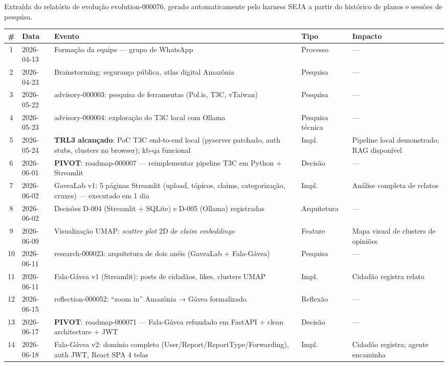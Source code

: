 \documentclass[12pt,a4paper]{article}
\begin{document}
Extraída do relatório de evolução evolution-000076, gerado automaticamente pelo harness
SEJA a partir do histórico de planos e sessões de pesquisa.

\begin{longtable}{>{\small}c >{\small}p{2cm} >{\small}p{6cm} >{\small}p{2cm} >{\small}p{3cm}}
\toprule
\textbf{\#} & \textbf{Data} & \textbf{Evento} & \textbf{Tipo} & \textbf{Impacto} \\
\midrule
\endhead
1 & 2026-04-13 & Formação da equipe — grupo de WhatsApp & Processo & — \\
2 & 2026-04-23 & Brainstorming: segurança pública, atlas digital Amazônia & Pesquisa & — \\
3 & 2026-05-22 & advisory-000003: pesquisa de ferramentas (Pol.is, T3C, vTaiwan) & Pesquisa & — \\
4 & 2026-05-23 & advisory-000004: exploração do T3C local com Ollama & Pesquisa técnica & — \\
5 & 2026-05-24 & \textbf{TRL3 alcançado}: PoC T3C end-to-end local (pyserver patchado, auth stubs, clusters no browser); kb-qa funcional & Impl. & Pipeline local demonstrado; RAG disponível \\
6 & 2026-06-01 & \textbf{PIVOT}: roadmap-000007 — reimplementar pipeline T3C em Python + Streamlit & Decisão & — \\
7 & 2026-06-02 & GaveaLab v1: 5 páginas Streamlit (upload, tópicos, claims, categorização, cruxes) — executado em 1 dia & Impl. & Análise completa de relatos \\
8 & 2026-06-02 & Decisões D-004 (Streamlit + SQLite) e D-005 (Ollama) registradas & Arquitetura & — \\
9 & 2026-06-09 & Visualização UMAP: \textit{scatter plot} 2D de \textit{claim embeddings} & Feature & Mapa visual de clusters de opiniões \\
10 & 2026-06-11 & research-000023: arquitetura de dois anéis (GaveaLab + Fala-Gávea) & Pesquisa & — \\
11 & 2026-06-11 & Fala-Gávea v1 (Streamlit): posts de cidadãos, likes, clusters UMAP & Impl. & Cidadão registra relato \\
12 & 2026-06-15 & reflection-000052: ``zoom in'' Amazônia → Gávea formalizado & Reflexão & — \\
13 & 2026-06-17 & \textbf{PIVOT}: roadmap-000071 — Fala-Gávea refundado em FastAPI + clean architecture + JWT & Decisão & — \\
14 & 2026-06-18 & Fala-Gávea v2: domínio completo (User/Report/ReportType/Forwarding), auth JWT, React SPA 4 telas & Impl. & Cidadão registra; agente encaminha \\

\end{longtable}
\end{document}

